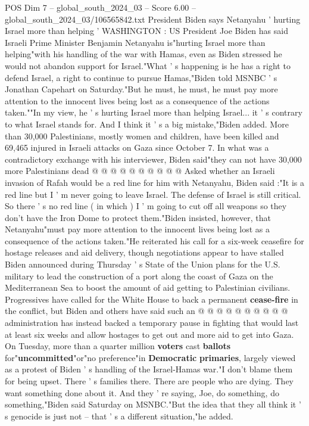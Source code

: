\begin{textsample}{POS Dim 7 – global\_south\_2024\_03 – Score 6.00 – global\_south\_2024\_03/106565842.txt}  \label{ex:f7_pos_165}
President Biden says Netanyahu ' hurting Israel more than helping ' WASHINGTON : US President Joe Biden has said Israeli Prime Minister Benjamin Netanyahu is"hurting Israel more than helping"with his handling of the war with Hamas, even as Biden stressed he would not abandon support for Israel."What ' s happening is he has a right to defend Israel, a right to continue to pursue Hamas,"Biden told MSNBC ' s Jonathan Capehart on Saturday."But he must, he must, he must pay more attention to the innocent lives being lost as a consequence of the actions taken.""In my view, he ' s hurting Israel more than helping Israel... it ' s contrary to what Israel stands for.
And I think it ' s a big mistake,"Biden added.
More than 30,000 Palestinians, mostly women and children, have been killed and 69,465 injured in Israeli attacks on Gaza since October 7.
In what was a contradictory exchange with his interviewer, Biden said"they can not have 30,000 more Palestinians dead @ @ @ @ @ @ @ @ @ @ Asked whether an Israeli invasion of Rafah would be a red line for him with Netanyahu, Biden said :"It is a red line but I ' m never going to leave Israel.
The defense of Israel is still critical.
So there ' s no red line ( in which ) I ' m going to cut off all weapons so they don't have the Iron Dome to protect them."Biden insisted, however, that Netanyahu"must pay more attention to the innocent lives being lost as a consequence of the actions taken."He reiterated his call for a six-week ceasefire for hostage releases and aid delivery, though negotiations appear to have stalled Biden announced during Thursday ' s State of the Union plans for the U.S. military to lead the construction of a port along the coast of Gaza on the Mediterranean Sea to boost the amount of aid getting to Palestinian civilians.
Progressives have called for the White House to back a permanent \textbf{cease-fire} in the conflict, but Biden and others have said such an @ @ @ @ @ @ @ @ @ @ administration has instead backed a temporary pause in fighting that would last at least six weeks and allow hostages to get out and more aid to get into Gaza.
On Tuesday, more than a quarter million \textbf{voters} cast \textbf{ballots} for"\textbf{uncommitted}"or"no preference"in \textbf{Democratic} \textbf{primaries}, largely viewed as a protest of Biden ' s handling of the Israel-Hamas war."I don't blame them for being upset.
There ' s families there.
There are people who are dying.
They want something done about it.
And they ' re saying, Joe, do something, do something,"Biden said Saturday on MSNBC."But the idea that they all think it ' s genocide is just not -- that ' s a different situation,"he added.

\end{textsample}
